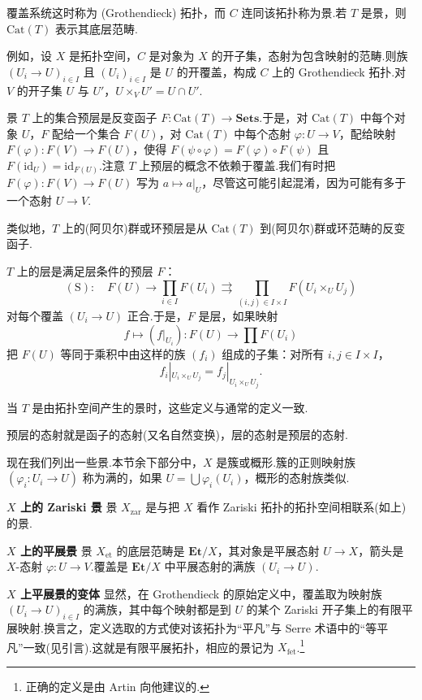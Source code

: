 覆盖系统这时称为 (Grothendieck) 拓扑，而 $C$ 连同该拓扑称为景.若 $T$ 是景，则 $\mathrm{Cat}(T)$ 表示其底层范畴.

例如，设 $X$ 是拓扑空间，$C$ 是对象为 $X$ 的开子集，态射为包含映射的范畴.则族 $(U_i \to U)_{i \in I}$ 且 $(U_i)_{i \in I}$ 是 $U$ 的开覆盖，构成 $C$ 上的 Grothendieck 拓扑.对 $V$ 的开子集 $U$ 与 $U'$，$U \times_{V} U' = U \cap U'$.

景 $T$ 上的集合预层是反变函子 $F \colon \mathrm{Cat}(T) \to \mathbf{Sets}$.于是，对 $\mathrm{Cat}(T)$ 中每个对象 $U$，$F$ 配给一个集合 $F(U)$，对 $\mathrm{Cat}(T)$ 中每个态射 $\varphi \colon U \to V$，配给映射 $F(\varphi) \colon F(V) \to F(U)$，使得 $F(\psi \circ \varphi) = F(\varphi) \circ F(\psi)$ 且 $F(\mathrm{id}_{U}) = \mathrm{id}_{F(U)}$.注意 $T$ 上预层的概念不依赖于覆盖.我们有时把 $F(\varphi) \colon F(V) \to F(U)$ 写为 $a \mapsto a|_{U}$，尽管这可能引起混淆，因为可能有多于一个态射 $U \to V$.

类似地，$T$ 上的(阿贝尔)群或环预层是从 $\mathrm{Cat}(T)$ 到(阿贝尔)群或环范畴的反变函子.

$T$ 上的层是满足层条件的预层 $F$：
\[
(\mathrm{S}) \colon \quad F(U) \to \prod_{i \in I} F(U_i) \rightrightarrows \prod_{(i, j) \in I \times I} F(U_i \times_{U} U_j)
\]
对每个覆盖 $(U_i \to U)$ 正合.于是，$F$ 是层，如果映射
\[
f \mapsto (f|_{U_i}) \colon F(U) \to \prod F(U_i)
\]
把 $F(U)$ 等同于乘积中由这样的族 $(f_i)$ 组成的子集：对所有 $i, j \in I \times I$，
\[
f_i|_{U_i \times_{U} U_j} = f_j|_{U_i \times_{U} U_j}.
\]

当 $T$ 是由拓扑空间产生的景时，这些定义与通常的定义一致.

预层的态射就是函子的态射(又名自然变换)，层的态射是预层的态射.

现在我们列出一些景.本节余下部分中，$X$ 是簇或概形.簇的正则映射族 $(\varphi_i \colon U_i \to U)$ 称为满的，如果 $U = \bigcup \varphi_i(U_i)$，概形的态射族类似.

\textbf{$X$ 上的 Zariski 景} 景 $X_{\mathrm{zar}}$ 是与把 $X$ 看作 Zariski 拓扑的拓扑空间相联系(如上)的景.

\textbf{$X$ 上的平展景} 景 $X_{\mathrm{et}}$ 的底层范畴是 $\mathbf{Et}/X$，其对象是平展态射 $U \to X$，箭头是 $X$-态射 $\varphi \colon U \to V$.覆盖是 $\mathbf{Et}/X$ 中平展态射的满族 $(U_i \to U)$.

\textbf{$X$ 上平展景的变体} 显然，在 Grothendieck 的原始定义中，覆盖取为映射族 $(U_i \to U)_{i \in I}$ 的满族，其中每个映射都是到 $U$ 的某个 Zariski 开子集上的有限平展映射.换言之，定义选取的方式使对该拓扑为``平凡''与 Serre 术语中的``等平凡''一致(见引言).这就是有限平展拓扑，相应的景记为 $X_{\mathrm{fet}}$.\footnote{正确的定义是由 Artin 向他建议的.}

